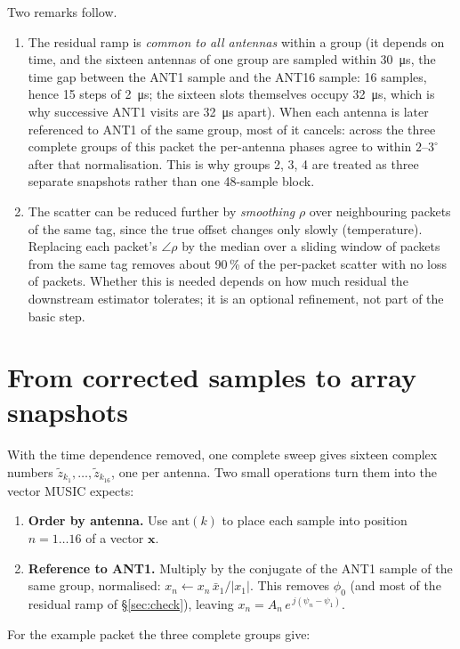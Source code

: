 \documentclass[11pt,a4paper]{article}
\begin{document}
Two remarks follow.
\begin{enumerate}
  \item The residual ramp is \emph{common to all antennas} within a group (it depends on time, and the sixteen antennas of one group are sampled within \SI{30}{\micro s}, the time gap between the ANT1 sample and the ANT16 sample: 16 samples, hence 15 steps of \SI{2}{\micro s}; the sixteen slots themselves occupy \SI{32}{\micro s}, which is why successive ANT1 visits are \SI{32}{\micro s} apart). When each antenna is later referenced to ANT1 of the same group, most of it cancels: across the three complete groups of this packet the per-antenna phases agree to within $2$--$3^\circ$ after that normalisation. This is why groups 2, 3, 4 are treated as three separate snapshots rather than one 48-sample block.
  \item The scatter can be reduced further by \emph{smoothing} $\rho$ over neighbouring packets of the same tag, since the true offset changes only slowly (temperature). Replacing each packet's $\angle\rho$ by the median over a sliding window of packets from the same tag removes about 90\,\% of the per-packet scatter with no loss of packets. Whether this is needed depends on how much residual the downstream estimator tolerates; it is an optional refinement, not part of the basic step.
\end{enumerate}

\section{From corrected samples to array snapshots}
With the time dependence removed, one complete sweep gives sixteen complex numbers $\tilde z_{k_1},\dots,\tilde z_{k_{16}}$, one per antenna. Two small operations turn them into the vector MUSIC expects:
\begin{enumerate}
  \item \textbf{Order by antenna.} Use $\mathrm{ant}(k)$ to place each sample into position $n = 1\dots16$ of a vector $\mathbf x$.
  \item \textbf{Reference to ANT1.} Multiply by the conjugate of the ANT1 sample of the same group, normalised: $x_n \leftarrow x_n\,\bar x_1 / |x_1|$. This removes $\phi_0$ (and most of the residual ramp of \S\ref{sec:check}), leaving $x_n = A_n\, e^{\,j(\psi_n - \psi_1)}$.
\end{enumerate}
For the example packet the three complete groups give:
\end{document}
